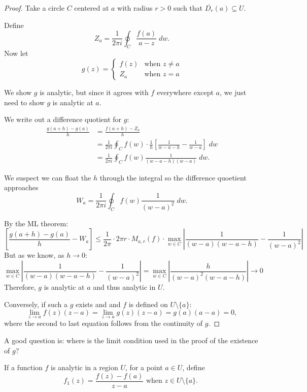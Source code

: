 \documentclass[notes]{subfile}
\begin{document}
\begin{proof}
    Take a circle $C$ centered at $a$ with radius $r > 0$ such that
    $\overline{D_r}(a) \subseteq U$.

    Define
    \[ Z_a = \frac{1}{2\pi i} \oint_C \frac{f(a)}{a-z} \; dw. \]
    Now let 
    \[ g(z) = \begin{cases}
            f(z) & \text{when $z \ne a$} \\
            Z_a & \text{when $z=a$}
        \end{cases}
    \]

    We show $g$ is analytic, but since it agrees with $f$
    everywhere except $a$, we just need to show $g$ is analytic
    at $a$.

    We write out a difference quotient for $g$:
    \begin{align*}
        \frac{g(a+h) - g(a)}{h} &= \frac{f(a+h) - Z_a}{h} \\
        &= \frac{1}{2\pi i} \oint_C f(w) \cdot \frac{1}{h}
        \left[ \frac{1}{w-a-h} - \frac{1}{w-a} \right] \; dw \\
        &= \frac{1}{2\pi i} \oint_C f(w) \frac{1}{(w-a-h)(w-a)} \; dw.
    \end{align*}

    We suspect we can float the $h$ through the integral so the 
    difference quoetient approaches
    \[ W_a = \frac{1}{2\pi i} \oint_C f(w) \frac{1}{(w-a)^2} \; dw. \]

    By the ML theorem:
    \[ \left[ \frac{g(a+h) - g(a)}{h} - W_a  \right] \le
        \frac{1}{2\pi} \cdot 2\pi r \cdot M_{a,r}(f) \cdot
        \max_{w \in C} \left| \frac{1}{(w-a)(w-a-h)} - 
    \frac{1}{(w-a)^2} \right| \]
    But as we know, as $ h \to 0$:
    \[ 
        \max_{w \in C} \left| \frac{1}{(w-a)(w-a-h)} - 
    \frac{1}{(w-a)^2} \right| = 
    \max_{w \in C} \left| \frac{h}{(w-a)^2(w-a-h)} \right| \to 0\]
    Therefore, $g$ is analytic at $a$ and thus analytic in $U$.

    \smallbreak
    Conversely, if such a $g$ exists and and $f$ is defined
    on $U \setminus \{ a \}$:
    \[ \lim_{z \to a} f(z)(z-a) = \lim_{z \to a} g(z)(z-a)
    = g(a)(a-a) = 0,\]
    where the second to last equation follows from the continuity of $g$.


\end{proof}

A good question is: where is the limit condition used in the proof
of the existence of $g$?

\smallbreak
\noindent
If a function $f$ is analytic in a region $U$, for a point
$a \in U$, define
\[ f_1(z) = \frac{f(z)-f(a)}{z-a} \text{  when $z \in U \setminus \{a\}$. } \]
\end{document}
